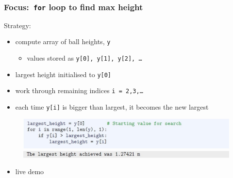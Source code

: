 \documentclass[english,14pt]{beamer}
\begin{document}
\begin{frame}[fragile]

\frametitle{Focus:~\texttt{for} loop to find max height}

Strategy:
\begin{itemize}
	\item compute array of ball heights, \texttt{y}
	\begin{itemize}
		\item values stored as \texttt{y[0], y[1], y[2], \ldots}
	\end{itemize}
	\item largest height initialised to \texttt{y[0]}
	\item work through remaining indices \texttt{i = 2,3,\ldots}
	\item each time \texttt{y[i]} is bigger than largest, it becomes the new largest
\end{itemize}

\begin{figure}[ht]
	\centering
	\includegraphics[width=\textwidth]{figures/LLp71b}
	\includegraphics[width=\textwidth]{figures/LLp71c}
\end{figure}
\vspace*{-3mm}
\begin{itemize}
	\item live demo
\end{itemize}

\end{frame}

\end{document}
